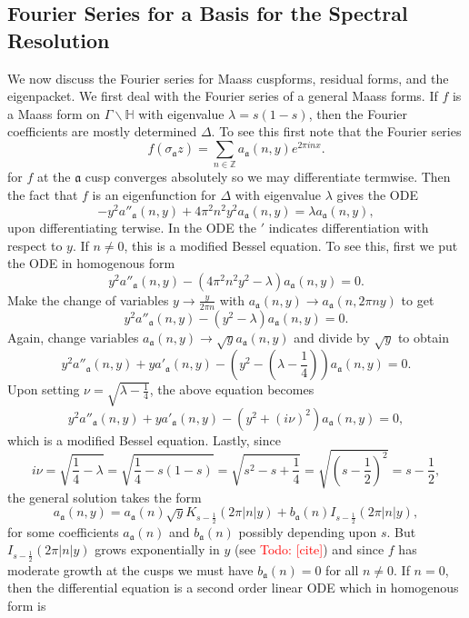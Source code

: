 \documentclass[12pt]{book}
\theoremstyle{definition}\newframedtheorem{method}{Method}
\newcommand{\mf}{\mathfrak}
\newcommand{\Z}{\mathbb{Z}}
\renewcommand{\H}{\mathbb{H}}
\renewcommand{\l}{\lambda}
\newcommand{\s}{\sigma}
\newcommand{\G}{\Gamma}
\newcommand{\D}{\Delta}
\newcommand{\<}{\langle}
\renewcommand{\>}{\rangle}
\newcommand{\GH}{\G\backslash\H}
\newcommand{\todo}[1]{\textcolor{red}{\sf Todo: [#1]}}
\begin{document}
    \subsection*{Fourier Series for a Basis for the Spectral Resolution}
      We now discuss the Fourier series for Maass cuspforms, residual forms, and the eigenpacket. We first deal with the Fourier series of a general Maass forms. If $f$ is a Maass form on $\GH$ with eigenvalue $\l = s(1-s)$, then the Fourier coefficients are mostly determined $\D$. To see this first note that the Fourier series
      \[
        f(\s_{\mf{a}}z) = \sum_{n \in \Z}a_{\mf{a}}(n,y)e^{2\pi inx}.
      \]
      for $f$ at the $\mf{a}$ cusp converges absolutely so we may differentiate termwise. Then the fact that $f$ is an eigenfunction for $\D$ with eigenvalue $\l$ gives the ODE
      \[
        -y^{2}a''_{\mf{a}}(n,y)+4\pi^{2}n^{2}y^{2}a_{\mf{a}}(n,y) = \l a_{\mf{a}}(n,y),
      \]
      upon differentiating terwise. In the ODE the $'$ indicates differentiation with respect to $y$. If $n \neq 0$, this is a modified Bessel equation. To see this, first we put the ODE in homogenous form
      \[
        y^{2}a''_{\mf{a}}(n,y)-(4\pi^{2}n^{2}y^{2}-\l)a_{\mf{a}}(n,y) = 0.
      \]
      Make the change of variables $y \to \frac{y}{2\pi n}$ with $a_{\mf{a}}(n,y) \to a_{\mf{a}}(n,2\pi ny)$ to get
      \[
        y^{2}a''_{\mf{a}}(n,y)-(y^{2}-\l)a_{\mf{a}}(n,y) = 0.
      \]
      Again, change variables $a_{\mf{a}}(n,y) \to \sqrt{y}a_{\mf{a}}(n,y)$ and divide by $\sqrt{y}$ to obtain
      \[
        y^{2}a''_{\mf{a}}(n,y)+ya'_{\mf{a}}(n,y)-\left(y^{2}-\left(\l-\frac{1}{4}\right)\right)a_{\mf{a}}(n,y) = 0.
      \]
      Upon setting $\nu = \sqrt{\l-\frac{1}{4}}$, the above equation becomes
      \[
        y^{2}a''_{\mf{a}}(n,y)+ya'_{\mf{a}}(n,y)-(y^{2}+(i\nu)^{2})a_{\mf{a}}(n,y) = 0,
      \]
      which is a modified Bessel equation. Lastly, since
      \[
        i\nu = \sqrt{\frac{1}{4}-\l} = \sqrt{\frac{1}{4}-s(1-s)} = \sqrt{s^{2}-s+\frac{1}{4}} = \sqrt{\left(s-\frac{1}{2}\right)^{2}} = s-\frac{1}{2},
      \]
      the general solution takes the form
      \[
        a_{\mf{a}}(n,y) = a_{\mf{a}}(n)\sqrt{y}K_{s-\frac{1}{2}}(2\pi|n|y)+b_{\mf{a}}(n)I_{s-\frac{1}{2}}(2\pi|n|y),
      \]
      for some coefficients $a_{\mf{a}}(n)$ and $b_{\mf{a}}(n)$ possibly depending upon $s$. But $I_{s-\frac{1}{2}}(2\pi|n|y)$ grows exponentially in $y$ (see \todo{cite}) and since $f$ has moderate growth at the cusps we must have $b_{\mf{a}}(n) = 0$ for all $n \neq 0$. If $n = 0$, then the differential equation is a second order linear ODE which in homogenous form is
\end{document}
